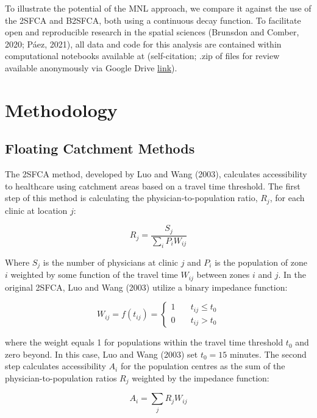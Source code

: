 \documentclass[]{elsarticle} %
\begin{document}
To illustrate the potential of the MNL approach, we compare it against
the use of the 2SFCA and B2SFCA, both using a continuous decay function.
To facilitate open and reproducible research in the spatial sciences
(Brunsdon and Comber, 2020; Páez, 2021), all data and code for this
analysis are contained within computational notebooks available at
(self-citation; .zip of files for review available anonymously via
Google Drive
\href{https://drive.google.com/file/d/1d66npiqIrawCU8DgNrYcztRJef80f7pd/view?usp=sharing}{link}).

\hypertarget{methodology}{%
\section{Methodology}\label{methodology}}

\hypertarget{floating-catchment-methods}{%
\subsection{Floating Catchment
Methods}\label{floating-catchment-methods}}

The 2SFCA method, developed by Luo and Wang (2003), calculates
accessibility to healthcare using catchment areas based on a travel time
threshold. The first step of this method is calculating the
physician-to-population ratio, \(R_j\), for each clinic at location
\(j\):

\[
R_j = \frac{S_j}{\sum_i{P_iW_{ij}}}
\]

Where \(S_j\) is the number of physicians at clinic \(j\) and \(P_i\) is
the population of zone \(i\) weighted by some function of the travel
time \(W_{ij}\) between zones \(i\) and \(j\). In the original 2SFCA,
Luo and Wang (2003) utilize a binary impedance function:

\[
W_{ij} = f(t_{ij}) = \left\{
        \begin{array}{ll}
            1 & \quad t_{ij} \leq t_0 \\
            0 & \quad t_{ij} > t_0
        \end{array}
    \right.
\]

where the weight equals 1 for populations within the travel time
threshold \(t_0\) and zero beyond. In this case, Luo and Wang (2003) set
\(t_0 = 15\) minutes. The second step calculates accessibility \(A_i\)
for the population centres as the sum of the physician-to-population
ratios \(R_j\) weighted by the impedance function:

\[
A_i = \sum_j{R_jW_{ij}}
\]
\end{document}
